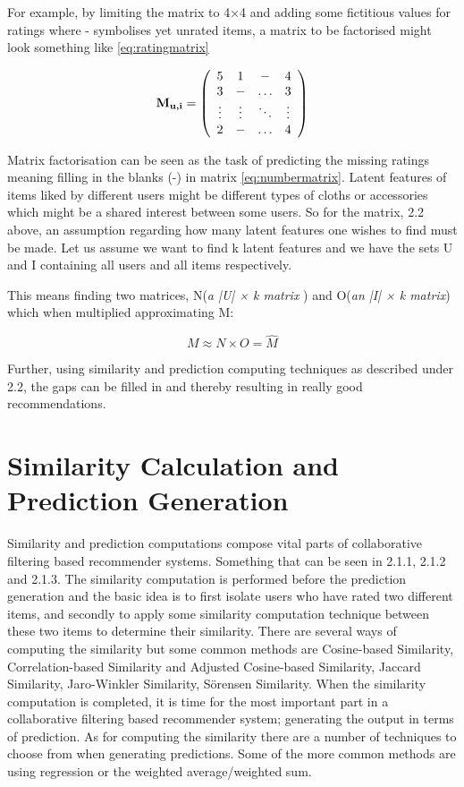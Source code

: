 For example, by limiting the matrix to 4×4 and adding some fictitious values for ratings
where - symbolises yet unrated items, a matrix to be factorised might look something
like \eqref{eq:ratingmatrix}


\[  
\label{eq:numbermatrix}
\textbf{M\textsubscript{u,i}} = \left(
\begin{array}{cccc}
5&1& - &4 \\
3&-&\ldots&3 \\
\vdots & \vdots & \ddots & \vdots \\
2&-& \ldots&4
\end{array}
\right)
\]

Matrix factorisation can be seen as the task of predicting the missing ratings meaning filling in the blanks (-) in matrix \eqref{eq:numbermatrix}. Latent features of items liked by different users might be different types of cloths or accessories which might be a shared interest between some users. So for the matrix, 2.2 above, an assumption regarding how many latent features one wishes to find must be made. Let us assume we want to find k latent features and we have the sets U and I containing all users and all items respectively.

This means finding two matrices, N(\textit{a  |U| × k matrix }) and O(\textit{an  |I| × k  matrix}) which when multiplied approximating M:

\[ M \approx N \times O = \hat{M} \]

Further, using similarity and prediction computing techniques as described under 2.2, the gaps can be filled in and thereby resulting in really good recommendations.

\section{Similarity Calculation and Prediction Generation}
Similarity and prediction computations compose vital parts of collaborative filtering based recommender systems. Something that can be seen in 2.1.1, 2.1.2 and 2.1.3. The similarity computation is performed before the prediction generation and the basic idea is to first isolate users who have rated two different items, and secondly to apply some similarity computation technique between these two items to determine their similarity. There are several ways of computing the similarity but some common methods are Cosine-based Similarity, Correlation-based Similarity and Adjusted Cosine-based Similarity, Jaccard Similarity, Jaro-Winkler Similarity, Sörensen Similarity.
When the similarity computation is completed, it is time for the most important part in a collaborative filtering based recommender system; generating the output in terms of prediction. As for computing the similarity there are a number of techniques to choose from when generating predictions. Some of the more common methods are using regression or the weighted average/weighted sum.

